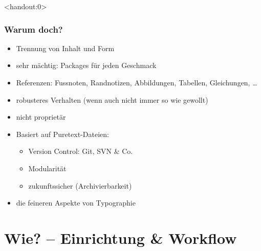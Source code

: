 \documentclass{beamer}                %
\begin{document}
\begin{frame}<handout:0>
    \frametitle{Warum doch?}
    \begin{itemize}
        \item
            Trennung von Inhalt und Form 
        \item
            sehr m\"achtig: Packages f\"ur jeden Geschmack
        \item
            Referenzen: Fussnoten,    Randnotizen,   Abbildungen,    Tabellen,
            Gleichungen, \ldots
        \item
            robusteres Verhalten (wenn auch nicht immer so wie gewollt)
        \item
            nicht propriet\"ar
        \item
            Basiert auf Puretext-Dateien:
            \begin{itemize}
                \item
                    Version Control: Git, SVN \& Co.
                \item
                    Modularit\"at
                \item
                    zukunftssicher (Archivierbarkeit)
            \end{itemize}
        \item
            die feineren Aspekte von Typographie
    \end{itemize}
\end{frame}

\section<handout:0>{Wie? -- Einrichtung \& Workflow} %
\end{document}
